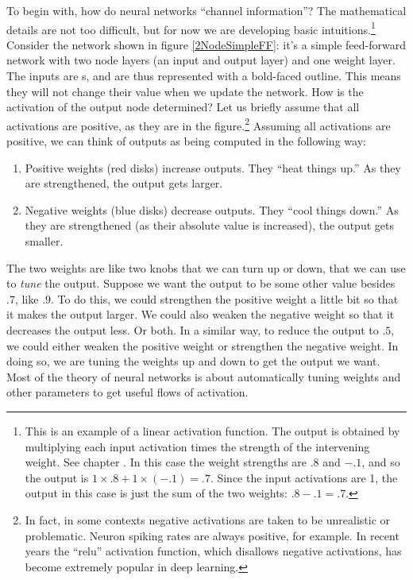 To begin with, how do neural networks ``channel information''? The mathematical details are not too difficult, but for now we are developing basic intuitions.\footnote{This is an example of a linear activation function. The output is obtained by multiplying each input activation times the strength of the intervening weight. See chapter . In this case the weight strengths are $.8$ and $-.1$, and so the output is $1 \times .8 + 1 \times (-.1) = .7$. Since the input activations are 1, the output in this case is just the sum of the two weights: $.8 -.1 = .7$.} Consider the network shown in figure \ref{2NodeSimpleFF}: it's a simple feed-forward network with two node layers (an input and output layer) and one weight layer. The inputs are s, and are thus represented with a bold-faced outline. This means they will not change their value when we update the network. How is the activation of the output node determined? Let us briefly assume that all activations are positive, as they are in the figure.\footnote{In fact, in some contexts negative activations are taken to be unrealistic or problematic. Neuron spiking rates are always positive, for example. In recent years the ``relu'' activation function, which disallows negative activations, has become extremely popular in deep learning.}  Assuming all activations are positive, we can think of outputs as being computed in the following way:
\begin{enumerate}
\item  Positive weights (red disks) increase outputs. They ``heat things up.'' As they are strengthened, the output gets larger.
\item  Negative weights (blue disks) decrease outputs. They ``cool things down.'' As they are strengthened (as their absolute value is increased), the output gets smaller.
\end{enumerate}
The two weights are like two knobs that we can turn up or down, that we can use to \emph{tune} the output. Suppose we want the output to be some other value besides $.7$, like $.9$. To do this, we could strengthen the positive weight a little bit so that it makes the output larger.  We could also weaken the negative weight so that it decreases the output less. Or both. In a similar way, to reduce the output to $.5$, we could either weaken the positive weight or strengthen the negative weight. In doing so, we are tuning the weights up and down to get the output we want.  Most of the theory of neural networks is about automatically tuning weights and other parameters to get useful flows of activation. 

